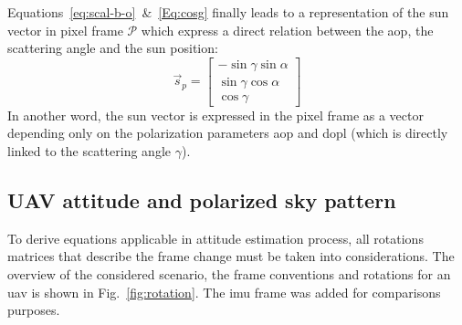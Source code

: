 Equations~\ref{eq:scal-b-o}~\&~\ref{Eq:cosg} finally leads to a representation of the sun vector
in pixel frame $\mathcal{P}$ which express a direct relation between the
\gls{aop}, the scattering angle and the sun position:
\begin{equation}
  \label{eq:sunp}
  \vec{s}_{p} =
    \begin{bmatrix}
    -\sin\gamma \sin\alpha\\
    \sin\gamma \cos\alpha\\
    \cos\gamma
  \end{bmatrix}
\end{equation}
In another word, the sun vector is expressed in the pixel frame as a vector depending only on the polarization parameters \gls{aop} and \gls{dopl} (which is directly linked to the scattering angle $\gamma$).

\subsection{UAV attitude and polarized sky pattern}
\label{subsec:ps-attitude}
To derive equations applicable in attitude estimation process, all rotations matrices that describe the frame change
must be taken into considerations. The overview of the considered scenario, the frame conventions and rotations
for an \gls{uav} is shown in Fig.~\ref{fig:rotation}. The \gls{imu} frame was added for comparisons purposes.

